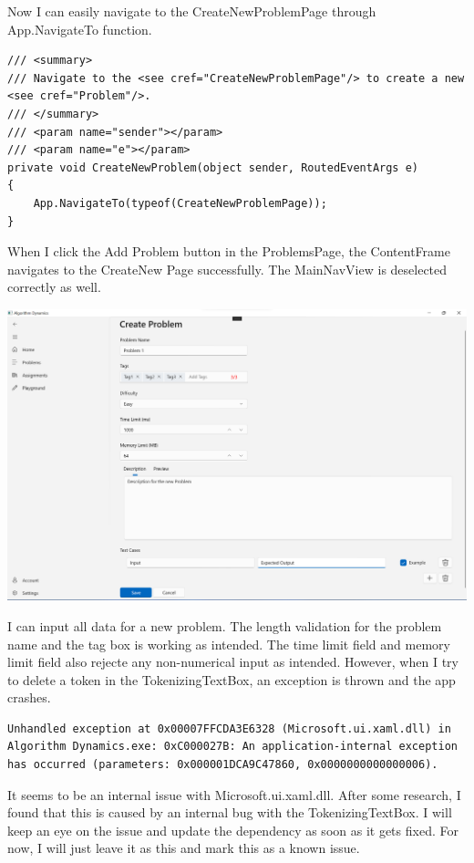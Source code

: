 \documentclass[a4paper]{report}
\begin{document}
Now I can easily navigate to the CreateNewProblemPage through App.NavigateTo function.

\begin{verbatim}
/// <summary>
/// Navigate to the <see cref="CreateNewProblemPage"/> to create a new <see cref="Problem"/>.
/// </summary>
/// <param name="sender"></param>
/// <param name="e"></param>
private void CreateNewProblem(object sender, RoutedEventArgs e)
{
    App.NavigateTo(typeof(CreateNewProblemPage));
}
\end{verbatim}

When I click the Add Problem button in the ProblemsPage, the ContentFrame navigates to the CreateNew Page successfully. The MainNavView is deselected correctly as well.

\includegraphics[width=\textwidth, height=\textheight, keepaspectratio]{CreateNewProblemPage-Layout}

I can input all data for a new problem. The length validation for the problem name and the tag box is working as intended. The time limit field and memory limit field also rejecte any non-numerical input as intended. However, when I try to delete a token in the TokenizingTextBox, an exception is thrown and the app crashes.

\begin{verbatim}
Unhandled exception at 0x00007FFCDA3E6328 (Microsoft.ui.xaml.dll) in Algorithm Dynamics.exe: 0xC000027B: An application-internal exception has occurred (parameters: 0x000001DCA9C47860, 0x0000000000000006).
\end{verbatim}

It seems to be an internal issue with Microsoft.ui.xaml.dll. After some research, I found that this is caused by an internal bug with the TokenizingTextBox\cite{github:WindowsCommunityToolkit:4437}. I will keep an eye on the issue and update the dependency as soon as it gets fixed. For now, I will just leave it as this and mark this as a known issue.
\end{document}
